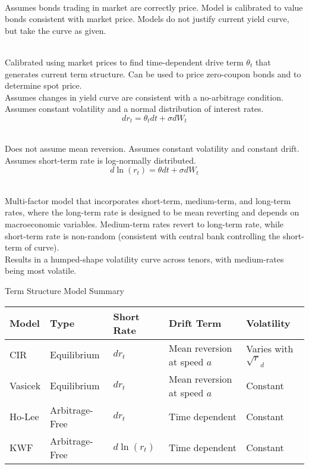 \begin{definition} \\
Assumes bonds trading in market are correctly price. Model is calibrated to value bonds consistent with market price. Models do not justify current yield curve, but take the curve as given.
\end{definition}

\begin{remark} \\
Calibrated using market prices to find time-dependent drive term $\theta_t$ that generates current term structure. Can be used to price zero-coupon bonds and to determine spot price.\\
Assumes changes in yield curve are consistent with a no-arbitrage condition.\\
Assumes constant volatility and a normal distribution of interest rates.
\begin{equation}
dr_t = \theta_t dt + \sigma dW_t \nonumber
\end{equation}
\end{remark}

\begin{remark} \\
Does not assume mean reversion. Assumes constant volatility and constant drift.\\
Assumes short-term rate is log-normally distributed.
\begin{equation}
d \ln (r_t) = \theta dt + \sigma dW_t \nonumber
\end{equation}
\end{remark}

\begin{remark} \\
Multi-factor model that incorporates short-term, medium-term, and long-term rates, where the long-term rate is designed to be mean reverting and depends on macroeconomic variables. Medium-term rates revert to long-term rate, while short-term rate is non-random (consistent with central bank controlling the short-term of curve).\\
Results in a humped-shape volatility curve across tenors, with medium-rates being most volatile.
\end{remark}

\begin{flushleft}
Term Structure Model Summary
\begin{tabularx}{\textwidth}{p{4em}|p{8em}|p{6em}|p{16em}|X}
\hline
\rowcolor{gray!30}
Model & Type & Short Rate & Drift Term & Volatility \\
\hline
CIR & Equilibrium & $dr_t$ & Mean reversion at speed $a$ & Varies with $\sqrt{r}_d$ \\
\hline
Vasicek & Equilibrium & $dr_t$ & Mean reversion at speed $a$ & Constant \\
\hline
Ho-Lee & Arbitrage-Free & $dr_t$ & Time dependent & Constant \\
\hline
KWF & Arbitrage-Free & $d \ln (r_t)$ & Time dependent & Constant \\
\hline
\end{tabularx}
\end{flushleft}
